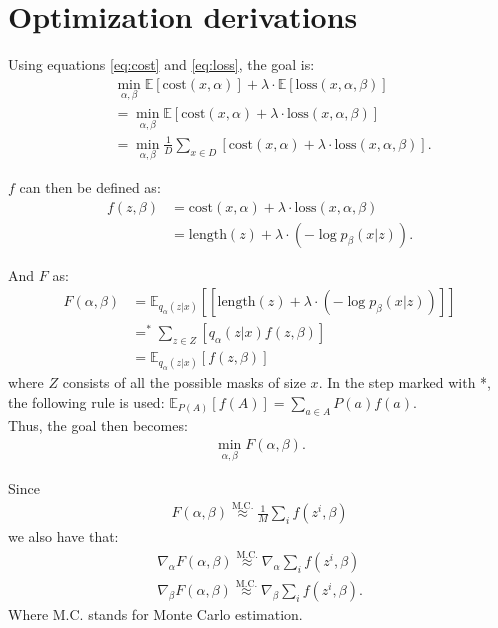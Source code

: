 \documentclass[a4paper, 12pt]{report}
\newcommand{\approxtext}[1]{\ensuremath{\stackrel{\text{#1}}{\approx}}}
\begin{document}
\chapter{Optimization derivations}
\label{app:gradients}
Using equations \ref{eq:cost} and \ref{eq:loss}, the goal is:
\begin{align*}
    \quad & \min_{\alpha, \beta} \mathbb{E} [\text{cost}(x, \alpha)] + \lambda \cdot \mathbb{E}[\text{loss}(x, \alpha, \beta)] \\
    &= \min_{\alpha, \beta} \mathbb{E} [\text{cost}(x, \alpha) + \lambda \cdot \text{loss}(x, \alpha, \beta)] \\
    &= \min_{\alpha, \beta} \frac{1}{D} \sum_{x \in D}[\text{cost}(x, \alpha) + \lambda \cdot \text{loss}(x, \alpha, \beta)].
\end{align*}

\noindent $f$ can then be defined as:
\begin{align*}
    f(z, \beta) &= \text{cost}(x, \alpha) + \lambda \cdot \text{loss}(x, \alpha, \beta) \\
    &= \text{length}(z) + \lambda \cdot (-\log p_{\beta}(x|z)).
\end{align*}

\noindent And $F$ as:
\begin{align*}
    F(\alpha, \beta) &= \mathbb{E}_{q_{\alpha}(z|x)} [[\text{length}(z) + \lambda \cdot (-\log p_{\beta}(x|z))]] \\
    &=^{\ast} \sum_{z\in Z} [q_{\alpha}(z|x) f(z, \beta)] \\
    &= \mathbb{E}_{q_{\alpha}(z|x)}[f(z, \beta)]
\end{align*}
where $Z$ consists of all the possible masks of size $x$. In the step marked with *, the following rule is used: $\mathbb{E}_{P(A)}[f(A)] = \sum_{a \in A}P(a)f(a)$. \\

\noindent Thus, the goal then becomes:
\begin{align*}
    \min_{\alpha, \beta} F(\alpha, \beta).
\end{align*}

\noindent Since
\begin{align*}
    F(\alpha, \beta) \approxtext{M.C.} \frac{1}{M} \sum_i f(z^{i}, \beta)
\end{align*}
we also have that:
\begin{align*}
    \nabla_{\alpha} F(\alpha, \beta) \approxtext{M.C.} \nabla_{\alpha} \sum_i f(z^{i}, \beta) \\
    \nabla_{\beta} F(\alpha, \beta) \approxtext{M.C.} \nabla_{\beta} \sum_i f(z^{i}, \beta).
\end{align*}
Where M.C. stands for Monte Carlo estimation. \\
\end{document}
